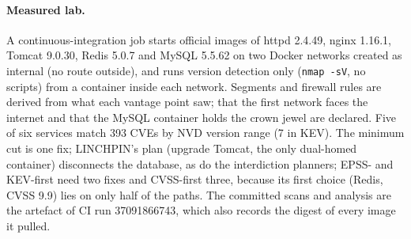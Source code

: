 \documentclass[11pt]{article}
\begin{document}
\begin{table}[t]
\centering\small
{}
\caption{Ablation: each planner runs the same optimizer on a degraded view and is scored on the full graph. Pooled
over \texttt{single}, \texttt{multi} and \texttt{ad}; identity data can only matter in \texttt{ad} and \texttt{multi}.}
\label{tab:ablation}
\end{table}

\paragraph{Measured lab.} A continuous-integration job starts official images of httpd 2.4.49, nginx 1.16.1,
Tomcat 9.0.30, Redis 5.0.7 and MySQL 5.5.62 on two Docker networks created as internal (no route outside), and runs
version detection only (\texttt{nmap -sV}, no scripts) from a container inside each network. Segments and firewall rules
are derived from what each vantage point saw; that the first network faces the internet and that the MySQL container
holds the crown jewel are declared. Five of six services match 393 CVEs by NVD version range (7 in KEV). The minimum
cut is one fix; LINCHPIN's plan (upgrade Tomcat, the only dual-homed container) disconnects the database, as do the
interdiction planners; EPSS- and KEV-first need two fixes and CVSS-first three, because its first choice (Redis,
CVSS 9.9) lies on only half of the paths. The committed scans and analysis are the artefact of CI run 37091866743,
which also records the digest of every image it pulled.
\end{document}
